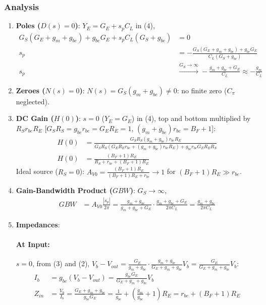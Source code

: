 \subsubsection{Analysis}
\begin{enumerate}
  \item \textbf{Poles (\(D(s) = 0\))}: \(Y_E = G_E + s_p C_L\) in (4),
    \begin{align*}
      G_S (G_E + g_m + g_{be}) + g_{be} G_E + s_p C_L (G_S + g_{be}) &= 0 \\
      s_p &= -\frac{G_S (G_E + g_m + g_{be}) + g_{be} G_E}{C_L (G_S + g_{be})} \\
      s_p &\xrightarrow{G_S \to \infty} -\frac{g_m + g_{be} + G_E}{C_L} \approx -\frac{g_m}{C_L}
    \end{align*}
  \item \textbf{Zeroes (\(N(s) = 0\))}: \(N(s) = G_S (g_m + g_{be}) \neq 0\): no finite zero (\(C_\pi\) neglected).
  \item \textbf{DC Gain (\(H(0)\))}: \(s = 0\) (\(Y_E = G_E\)) in (4), top and bottom multiplied by
    \(R_S r_{be} R_E\) [\(G_S R_S = g_{be} r_{be} = G_E R_E = 1\), \((g_m + g_{be}) r_{be} = B_F + 1\)]:
    \begin{align*}
      H(0) &= \frac{G_S R_S (g_m + g_{be}) r_{be} R_E}{G_S R_S \left(G_E R_E r_{be} + (g_m + g_{be}) r_{be} R_E\right) + g_{be} r_{be} G_E R_E R_S} \\
      H(0) &= \frac{(B_F + 1) R_E}{R_S + r_{be} + (B_F + 1) R_E}
    \end{align*}
    Ideal source (\(R_S = 0\)):
    \(A_{V0} = \frac{(B_F + 1) R_E}{(B_F + 1) R_E + r_{be}} \to 1\) for \((B_F + 1) R_E \gg r_{be}\).
  \item \textbf{Gain-Bandwidth Product (\(GBW\))}: \(G_S \to \infty\),
    \begin{align*}
      GBW &= A_{V0} \frac{|s_p|}{2\pi} = \frac{g_m + g_{be}}{g_m + g_{be} + G_E}\cdot\frac{g_m + g_{be} + G_E}{2\pi C_L} = \frac{g_m + g_{be}}{2\pi C_L}
    \end{align*}
  \item \textbf{Impedances}:
    \paragraph{At Input:} \(s = 0\), from (3) and (2),
    \(V_b - V_{out} = \frac{G_E}{g_m + g_{be}}\cdot\frac{g_m + g_{be}}{G_E + g_m + g_{be}} V_b = \frac{G_E}{G_E + g_m + g_{be}} V_b\):
    \begin{align*}
      I_b &= g_{be}(V_b - V_{out}) = \frac{g_{be} G_E}{G_E + g_m + g_{be}} V_b \\
      Z_{in} &= \frac{V_b}{I_b} = \frac{G_E + g_m + g_{be}}{g_{be} G_E} = \frac{1}{g_{be}} + \left(\frac{g_m}{g_{be}} + 1\right) R_E = r_{be} + (B_F + 1) R_E
    \end{align*}

\end{enumerate}
